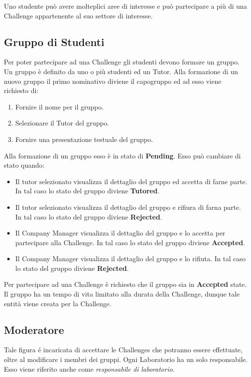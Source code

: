 Uno studente può avere molteplici aree di interesse e può partecipare a più di una Challenge appartenente al suo settore di interesse.

\subsection{Gruppo di Studenti}
Per poter partecipare ad una Challenge gli studenti devono formare un gruppo. Un gruppo è definito da uno o più studenti ed un Tutor. 
Alla formazione di un nuovo gruppo il primo nominativo diviene il capogruppo ed ad esso viene richiesto di:
 \begin{enumerate}
        \item Fornire il nome per il gruppo.
        \item Selezionare il Tutor del gruppo. 
        \item Fornire una presentazione testuale del gruppo. 
\end{enumerate}

Alla formazione di un gruppo esso è in stato di \textbf{Pending}. Esso può cambiare di stato quando:
\begin{itemize}
    \item Il tutor selezionato visualizza il dettaglio del gruppo ed accetta di farne parte. In tal caso lo stato del gruppo diviene \textbf{Tutored}. 
    \item Il tutor selezionato visualizza il dettaglio del gruppo e rifiura di farna parte. In tal caso lo stato del gruppo diviene \textbf{Rejected}. 
    \item Il Company Manager visualizza il dettaglio del gruppo e lo accetta per partecipare alla Challenge. In tal caso lo stato del gruppo diviene \textbf{Accepted}. 
    \item Il Company Manager visualizza il dettaglio del gruppo e lo rifiuta. In tal caso lo stato del gruppo diviene \textbf{Rejected}. 
\end{itemize}

Per partecipare ad una Challenge è richiesto che il gruppo sia in \textbf{Accepted} state. Il gruppo ha un tempo di vita limitato alla durata della Challenge, dunque tale entità viene creata per la Challenge.



\subsection{Moderatore}
\label{sec:moderatore}
Tale figura é incaricata di accettare le Challenges che potranno essere effettuate, oltre al modificare i membri dei gruppi. Ogni Laboratorio ha un solo responsabile. Esso viene riferito anche come \textit{responsabile di laboratorio}.


